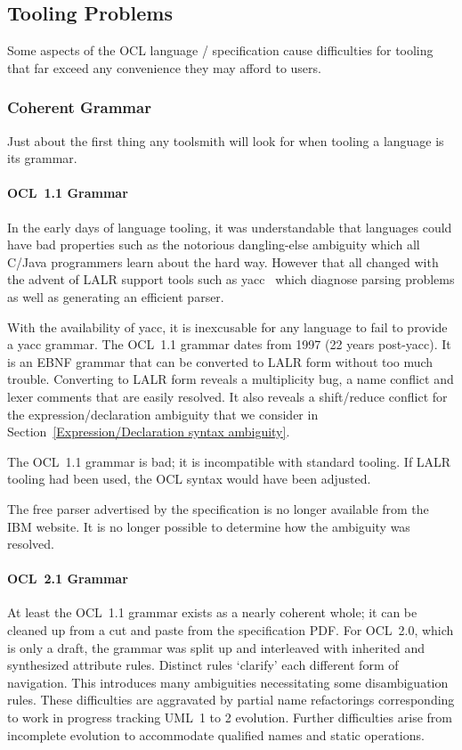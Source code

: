 \documentclass{jot}
\begin{document}
\subsection{Tooling Problems}

Some aspects of the OCL language / specification cause difficulties for tooling that far exceed any convenience they may afford to users.

\subsubsection{Coherent Grammar}

Just about the first thing any toolsmith will look for when tooling a language is its grammar.

\paragraph{OCL~1.1 Grammar}

In the early days of language tooling, it was understandable that languages could have bad properties such as the notorious dangling-else ambiguity which all C/Java programmers learn about the hard way. However that all changed with the advent of LALR support tools such as yacc~\cite{YACC} which diagnose parsing problems as well as generating an efficient parser.

With the availability of yacc, it is inexcusable for any language to fail to provide a yacc grammar. The OCL~1.1 grammar dates from 1997 (22 years post-yacc). It is an EBNF grammar that can be converted to LALR form without too much trouble. Converting to LALR form reveals a multiplicity bug, a name conflict and lexer comments that are easily resolved. It also reveals a shift/reduce conflict for the expression/declaration ambiguity that we consider in Section~\ref{Expression/Declaration syntax ambiguity}.

The OCL~1.1 grammar is bad; it is incompatible with standard tooling. If LALR tooling had been used, the OCL syntax would have been adjusted.

The free parser advertised by the specification is no longer available from the IBM website. It is no longer possible to determine how the ambiguity was resolved.

\paragraph{OCL~2.1 Grammar}

At least the OCL~1.1 grammar exists as a nearly coherent whole; it can be cleaned up from a cut and paste from the specification PDF. For OCL~2.0, which is only a draft, the grammar was split up and interleaved with inherited and synthesized attribute rules. Distinct rules `clarify' each different form of navigation. This introduces many ambiguities necessitating some disambiguation rules. These difficulties are aggravated by partial name refactorings corresponding to work in progress tracking UML~1 to 2 evolution. Further difficulties arise from incomplete evolution to accommodate qualified names and static operations.
\end{document}
